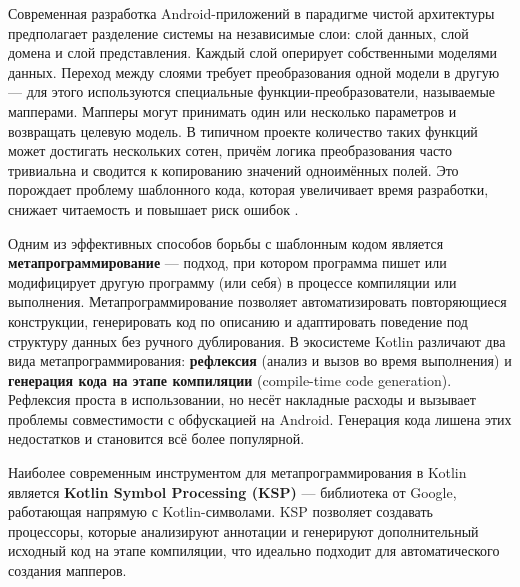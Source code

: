
Современная разработка Android-приложений в парадигме чистой архитектуры \cite{refd} предполагает разделение системы на независимые слои: слой данных, слой домена и слой представления. Каждый слой оперирует собственными моделями данных. Переход между слоями требует преобразования одной модели в другую — для этого используются специальные функции-преобразователи, называемые мапперами. Мапперы могут принимать один или несколько параметров и возвращать целевую модель. В типичном проекте количество таких функций может достигать нескольких сотен, причём логика преобразования часто тривиальна и сводится к копированию значений одноимённых полей. Это порождает проблему шаблонного кода, которая увеличивает время разработки, снижает читаемость и повышает риск ошибок \cite{refi}.

Одним из эффективных способов борьбы с шаблонным кодом является \textbf{метапрограммирование} — подход, при котором программа пишет или модифицирует другую программу (или себя) в процессе компиляции или выполнения. Метапрограммирование позволяет автоматизировать повторяющиеся конструкции, генерировать код по описанию и адаптировать поведение под структуру данных без ручного дублирования. В экосистеме Kotlin \cite{refg} различают два вида метапрограммирования: \textbf{рефлексия} (анализ и вызов во время выполнения) и \textbf{генерация кода на этапе компиляции} (compile-time code generation). Рефлексия проста в использовании, но несёт накладные расходы и вызывает проблемы совместимости с обфускацией на Android. Генерация кода лишена этих недостатков и становится всё более популярной.

Наиболее современным инструментом для метапрограммирования в Kotlin является \textbf{Kotlin Symbol Processing (KSP)} \cite{refj} — библиотека от Google, работающая напрямую с Kotlin-символами. KSP позволяет создавать процессоры, которые анализируют аннотации и генерируют дополнительный исходный код на этапе компиляции, что идеально подходит для автоматического создания мапперов.
